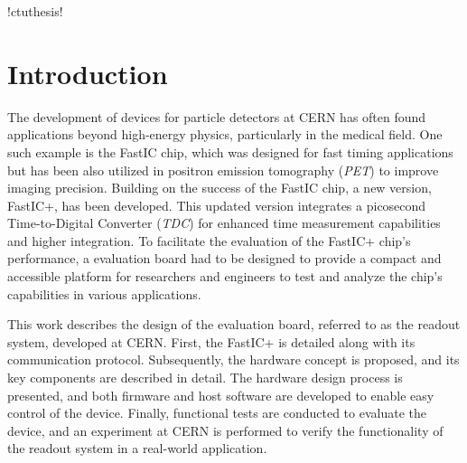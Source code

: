 \documentclass[twoside]{ctuthesis}
\theoremstyle{plain}
\theoremstyle{definition}
\theoremstyle{note}
\begin{document}
\renewcommand \ctulstsep {0pt}

\newcommand\ctuclsname{\leavevmode\unhcopy\ctuclsnamebox}
\newsavebox\ctuclsnamebox
\begin{lrbox}{\ctuclsnamebox}
\ctulst!ctuthesis!
\end{lrbox}

\maketitle


\newpage
\begingroup
\color{black}
\endgroup

\pagebreak

\chapter{Introduction}
The development of devices for particle detectors at CERN has often found applications beyond high-energy physics, particularly in the medical field. One such example is the FastIC chip, which was designed for fast timing applications but has been also utilized in positron emission tomography (\emph{PET}) to improve imaging precision. Building on the success of the FastIC chip, a new version, FastIC+, has been developed. This updated version integrates a picosecond Time-to-Digital Converter (\emph{TDC}) for enhanced time measurement capabilities and higher integration. To facilitate the evaluation of the FastIC+ chip's performance, a evaluation board had to be designed to provide a compact and accessible platform for researchers and engineers to test and analyze the chip's capabilities in various applications.

This work describes the design of the evaluation board, referred to as the readout system, developed at CERN. First, the FastIC+ is detailed along with its communication protocol. Subsequently, the hardware concept is proposed, and its key components are described in detail. The hardware design process is presented, and both firmware and host software are developed to enable easy control of the device. Finally, functional tests are conducted to evaluate the device, and an experiment at CERN is performed to verify the functionality of the readout system in a real-world application.









\end{document}
